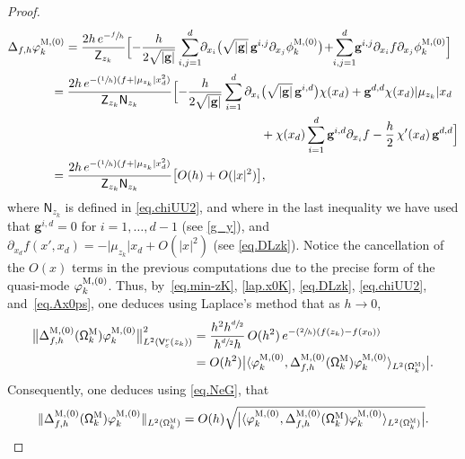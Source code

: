\documentclass[JEP,XML,SOM,Unicode,NoEqCountersInSection,NoFloatCountersInSection,published]{cedram}
\newcommand{\Psfrac}[2]{(\sfrac{#1}{#2})}
\newcommand{\mbf}[1]{\mathbf{#1}}
\let\ve\varepsilon
\theoremstyle{plain}
\theoremstyle{definition}
\begin{document}
\begin{proof}
\begin{align*}
\Delta_{f,h} \varphi^{\textsc{M},(0)}_k&=\frac{2h\, e^{-\sfrac f h}}{\mathsf Z_{z_k} }\Bigl[ -\frac{h}{2\sqrt{\vert \mbf g\vert}}\sum_{i,j=1}^d\hspace*{-1mm} \partial_{x_i}\bigl(\sqrt{\vert \mbf g\vert} \, \mbf g^{i,j} \partial_{x_j}\phi^{\textsc{M},(0)}_k \bigr) \!+ \hspace*{-1mm}\sum_{i,j=1}^d \hspace*{-1mm}\mbf g^{i,j} \partial_{x_i}f\partial_{x_j}\phi^{\textsc{M},(0)}_k\Bigr]\\
&\hspace*{-4mm}= \frac{2h \, e^{-\Psfrac 1h(f + \vert \mu_{z_k}\vert x_d^2)}}{\mathsf Z_{z_k}\mathsf N_{z_k}}
\Bigl[ -\frac{h}{2\sqrt{\vert \mbf g\vert}}\sum_{i=1}^d \partial_{x_i}\bigl(\sqrt{\vert \mbf g\vert} \, \mbf g^{i,d} \bigr)\chi(x_d) + \mbf g^{d,d}\chi (x_d)\vert \mu_{z_k}\vert x_d
\\
&\hspace*{5.65cm} + \chi(x_d) \sum_{i=1}^d \mbf g^{i,d} \partial_{x_i}f - \frac h2\,\chi'(x_d) \, \mbf g^{d,d} \Bigr] \\
&\hspace*{-4mm}=\frac{2h\, e^{-\Psfrac 1h(f + \vert \mu_{z_k}\vert x_d^2)}}{\mathsf Z_{z_k}\mathsf N_{z_k}}
\big[ O(h) + O(\vert x\vert^2) \big],
\end{align*}
where $\mathsf N_{z_k}$ is defined in \eqref{eq.chiUU2}, and where in the last inequality we have used that $\mbf g^{i,d}=0$ for $i=1,\ldots,d-1$ (see \eqref{g_y}), and $\partial_{x_d}f(x',x_d)= -\vert \mu_{z_k}\vert x_d+O(\vert x\vert^2)$ (see \eqref{eq.DLzk}).
Notice the cancellation of the $O(x)$ terms in the previous computations due to the precise form of the quasi-mode $\varphi^{\textsc{M},(0)}_k$.
Thus, by~\eqref{eq.min-zK}, \eqref{lap.x0K}, \eqref{eq.DLzk}, \eqref{eq.chiUU2}, and~\eqref{eq.Ax0ps}, one deduces using Laplace's method that as $h\to 0$,
\begin{align*}
\bigl\Vert \Delta_{f,h}^{\textsc{M}, (0)}(\mathsf \Omega_k^{\textsc{M}})\varphi^{\textsc{M},(0)}_k\bigr\Vert_{L^2(\mathsf V_{\ve}^r(z_k))}^2&= \frac{ h^2 h^{\sfrac{d}{2} } }{ h^{\sfrac{d}{2} } h}\, O(h^2) \, e^{-\Psfrac 2h (f(z_k)-f(x_0))} \\
&=O(h^2) \bigl\vert \langle \varphi^{\textsc{M},(0)}_k,\Delta_{f,h}^{\textsc{M}, (0)}(\mathsf \Omega_k^{\textsc{M}}) \varphi^{\textsc{M},(0)}_k \rangle_{L^2(\mathsf \Omega_k^{\textsc{M}})}\bigr\vert.
\end{align*}
Consequently, one deduces using \eqref{eq.NeG}, that
\begin{equation}\label{eq.Ax0ps2}
\Vert \Delta_{f,h}^{\textsc{M}, (0)}(\mathsf \Omega_k^{\textsc{M}})\varphi^{\textsc{M},(0)}_k\Vert_{L^2(\mathsf \Omega_k^{\textsc{M}})}=O(h) \sqrt{\bigl\vert \langle \varphi^{\textsc{M},(0)}_k,\Delta_{f,h}^{\textsc{M}, (0)}(\mathsf \Omega_k^{\textsc{M}}) \varphi^{\textsc{M},(0)}_k \rangle_{L^2(\mathsf \Omega_k^{\textsc{M}})}\bigr\vert}.
\end{equation}


\end{proof}
\end{document}
